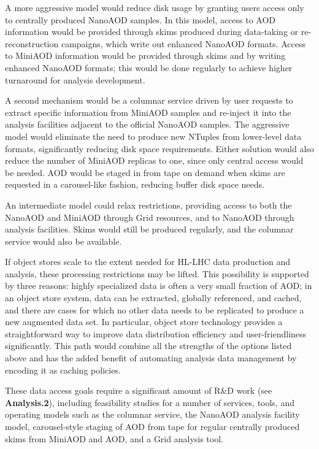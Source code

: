 A more aggressive model would reduce disk usage by granting users access only to centrally produced NanoAOD samples. In this model, access to \gls{AOD} information would be provided through skims produced during data-taking or re-reconstruction campaigns, which write out enhanced NanoAOD formats. Access to MiniAOD information would be provided through skims and by writing enhanced NanoAOD formats; this would be done regularly to achieve higher turnaround for analysis development.

A second mechanism would be a columnar service driven by user requests to extract specific information from MiniAOD samples and re-inject it into the analysis facilities adjacent to the official NanoAOD samples. The aggressive model would eliminate the need to produce new NTuples from lower-level data formats, significantly reducing disk space requirements. Either solution would also reduce the number of MiniAOD replicas to one, since only central access would be needed. \gls{AOD} would be staged in from tape on demand when skims are requested in a carousel-like fashion, reducing buffer disk space needs.

An intermediate model could relax restrictions, providing access to both the NanoAOD and MiniAOD through Grid resources, and to NanoAOD through analysis facilities. Skims would still be produced regularly, and the columnar service would also be available.

If object stores scale to the extent needed for \gls{HL-LHC} data production and analysis, these processing restrictions may be lifted. This possibility is supported by three reasons: highly specialized data is often a very small fraction of \gls{AOD}; in an object store system, data can be extracted, globally referenced, and cached, and there are cases for which no other data needs to be replicated to produce a new augmented data set. In particular, object store technology provides a straightforward way to improve data distribution efficiency and user-friendliness significantly. This path would combine all the strengths of the options listed above and has the added benefit of automating analysis data management by encoding it as caching policies.

These data access goals require a significant amount of R\&D work (see \textbf{Analysis.2}), including feasibility studies for a number of services, tools, and operating models such as the columnar service, the NanoAOD analysis facility model, carousel-style staging of \gls{AOD} from tape for regular centrally produced skims from MiniAOD and \gls{AOD}, and a Grid analysis tool. 

